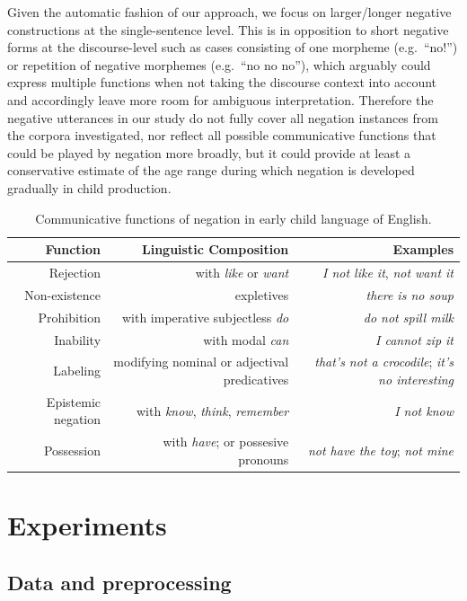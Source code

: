 \documentclass[10pt, letterpaper]{article}
\begin{document}
Given the automatic fashion of our approach, we focus on larger/longer
negative constructions at the single-sentence level. This is in
opposition to short negative forms at the discourse-level such as cases
consisting of one morpheme (e.g.~``no!'') or repetition of negative
morphemes (e.g.~``no no no''), which arguably could express multiple
functions when not taking the discourse context into account and
accordingly leave more room for ambiguous interpretation. Therefore the
negative utterances in our study do not fully cover all negation
instances from the corpora investigated, nor reflect all possible
communicative functions that could be played by negation more broadly,
but it could provide at least a conservative estimate of the age range
during which negation is developed gradually in child production.

\begin{table}[h]
\small
\centering
\begin{tabular}{rrr}
  \hline
 \textbf{Function} & \textbf{Linguistic Composition} & \textbf{Examples} \\
  \hline
Rejection & with \textit{like} or \textit{want} & \textit{I not like it}, \textit{not want it}  \\
Non-existence & expletives & \textit{there is no soup} \\
Prohibition & with imperative subjectless \textit{do} & \textit{do not spill milk} \\
Inability & with modal \textit{can} & \textit{I cannot zip it} \\
Labeling & modifying nominal or adjectival predicatives & \textit{that's not a crocodile}; \textit{it's no interesting} \\
Epistemic negation & with \textit{know}, \textit{think}, \textit{remember}  & \textit{I not know} \\
Possession & with \textit{have}; or possesive pronouns & \textit{not have the toy}; \textit{not mine} \\
   \hline
\end{tabular}
\caption{Communicative functions of negation in early child language of English.}
\end{table}

\hypertarget{experiments}{%
\section{Experiments}\label{experiments}}

\hypertarget{data-and-preprocessing}{%
\subsection{Data and preprocessing}\label{data-and-preprocessing}}
\end{document}
